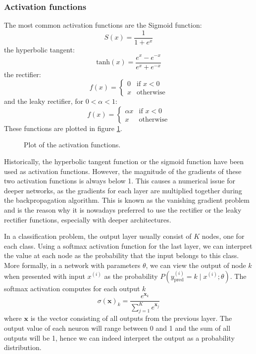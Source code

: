 \documentclass[12pt,a4paper,twoside,openright]{report}
\newlength\figureheight
\newlength\figurewidth
\begin{document}
\subsubsection{Activation functions}
The most common activation functions are the Sigmoid function:
\begin{equation}
S(x) = \frac{1}{1 + e^x}
\end{equation}
the hyperbolic tangent:
\begin{equation}
	\textrm{tanh}(x)=\frac{e^x - e^{-x}}{e^x + e^{-x}}
\end{equation}
the rectifier:
\begin{equation}
\label{eq:linear_rectifier}
	f(x) = 
\begin{cases}
	0 & \text{if } x < 0\\
	x & \text{otherwise}
\end{cases}
\end{equation}
and the leaky rectifier, for $0 < \alpha < 1$:
\begin{equation}
f(x) = 
\begin{cases}
	\alpha x & \text{if } x < 0\\
	x & \text{otherwise}
\end{cases}
\end{equation}
These functions are plotted in figure \ref{fig:activation_functions}. 
\begin{figure}
	\centering 
	\setlength\figureheight{10cm}
	\setlength{}
	
	\caption{Plot of the activation functions.}
	\label{fig:activation_functions}
\end{figure}
Historically, the hyperbolic tangent function or the sigmoid function have been used as activation functions. However, the magnitude of the gradients of these two activation functions is always below 1. This causes a numerical issue for deeper networks, as the gradients for each layer are multiplied together during the backpropagation algorithm. This is known as the vanishing gradient problem \cite{vanishing_gradients} and is the reason why it is nowadays preferred to use the rectifier or the leaky rectifier functions, especially with deeper architectures.

In a classification problem, the output layer usually consist of $K$ nodes, one for each class. Using a softmax activation function for the last layer, we can interpret the value at each node as the probability that the input belongs to this class.  More formally, in a network with parameters $\theta$, we can view the output of node $k$ when presented with input $x^{(i)}$ as the probability $P(y_{\text{pred}}^{(i)} = k \mid x^{(i)};\theta)$. The softmax activation computes for each output $k$
\begin{equation}
	\sigma(\mathbf{x})_k = \frac{e^{\mathbf{x}_k}}{\sum_{j=1}^{K}e^{\mathbf{x}_j}}
\end{equation}
where $\mathbf{x}$ is the vector consisting of all outputs from the previous layer. The output value of each neuron will range between 0 and 1 and the sum of all outputs will be 1, hence we can indeed interpret the output as a probability distribution.
\end{document}
